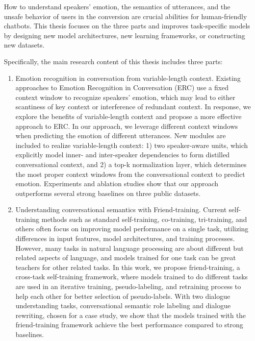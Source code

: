 \begin{eabstract}
	How to understand speakers' emotion, the semantics of utterances, and the unsafe behavior of users in the conversion are crucial abilities for human-friendly chatbots. This thesis focuses on the three parts and improves task-specific models by designing new model architectures, new learning frameworks, or constructing new datasets. 
	
	Specifically, the main research content of this thesis includes three parts:
	
	\begin{enumerate}
		
		\item Emotion recognition in conversation from variable-length context. Existing approaches to Emotion Recognition in Conversation (ERC) use a fixed context window to recognize speakers' emotion, which may lead to either scantiness of key context or interference of redundant context. In response, we explore the benefits of variable-length context and propose a more effective approach to ERC. In our approach, we leverage different context windows when predicting the emotion of different utterances. New modules are included to realize variable-length context: 1) two speaker-aware units, which explicitly model inner- and inter-speaker dependencies to form distilled conversational context, and 2) a top-k normalization layer, which determines the most proper context windows from the conversational context to predict emotion. Experiments and ablation studies show that our approach outperforms several strong baselines on three public datasets. 
		      
		\item Understanding conversational semantics with Friend-training. Current self-training methods such as standard self-training, co-training, tri-training, and others often focus on improving model performance on a single task, utilizing differences in input features, model architectures, and training processes. However, many tasks in natural language processing are about different but related aspects of language, and models trained for one task can be great teachers for other related tasks. In this work, we propose friend-training, a cross-task self-training framework, where models trained to do different tasks are used in an iterative training, pseudo-labeling, and retraining process to help each other for better selection of pseudo-labels. With two dialogue understanding tasks, conversational semantic role labeling and dialogue rewriting, chosen for a case study, we show that the models trained with the friend-training framework achieve the best performance compared to strong baselines.
		      

\end{enumerate}
\end{eabstract}
